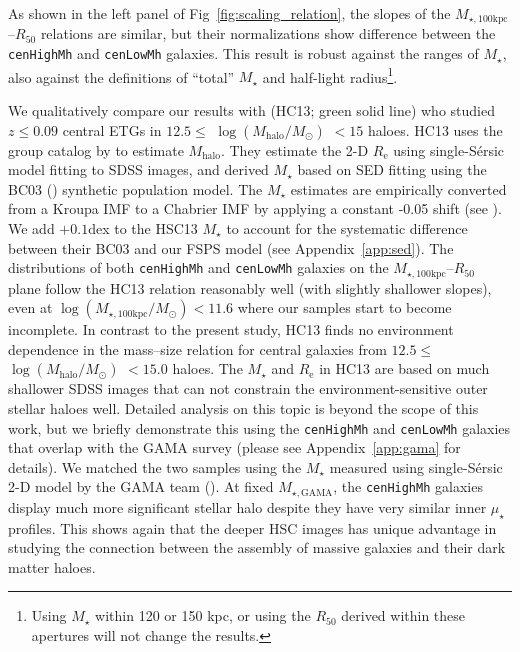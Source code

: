 \documentclass[a4paper,fleqn,usenatbib]{mnras}
\def\ser{{S\'{e}rsic\ }}
\def\rbcg{\texttt{cenHighMh}}
\def\nbcg{\texttt{cenLowMh}}
\def\mstar{{$M_{\star}$}}
\def\mhalo{{$M_{\mathrm{halo}}$}}
\def\logmh{{$\log (M_{\mathrm{halo}}/M_{\odot})$}}
\def\mtot{{$M_{\star,100\mathrm{kpc}}$}}
\def\mgama{{$M_{\star,\mathrm{GAMA}}$}}
\def\logmtot{{$\log (M_{\star,100\mathrm{kpc}}/M_{\odot})$}}
\def\mden{{$\mu_{\star}$}}
\begin{document}
    \noindent As shown in the left panel of Fig~\ref{fig:scaling_relation}, the slopes 
    of the \mtot{}--$R_{\mathrm{50}}$ relations are similar, but their normalizations 
    show difference between the \rbcg{} and \nbcg{} galaxies. 
    This result is robust against the ranges of \mstar{}, also against the definitions 
    of  ``total'' \mstar{} and half-light radius\footnote{Using \mstar{} within 120 or 
    150 kpc, or using the $R_{\mathrm{50}}$ derived within these apertures will not 
    change the results.}.
    
    We qualitatively compare our results with \citealt{HCompany13} (HC13; 
    green solid line) who studied $z\leq 0.09$ central ETGs in 
    $12.5 \le$ \logmh{} $< 15$ haloes. 
    HC13 uses the group catalog by \citet{Yang2007} to estimate \mhalo{}. 
    They estimate the 2-D $R_{\mathrm{e}}$ using single-\ser{} model fitting to SDSS 
    images, and derived \mstar{} based on SED fitting using the BC03 (\citealt{BC03}) 
    synthetic population model. 
    The \mstar{} estimates are empirically converted from a Kroupa IMF to a Chabrier 
    IMF by applying a constant -0.05 shift (see \citealt{Bernardi2016}).
    We add $+0.1$dex to the HSC13 \mstar{} to account for the systematic 
    difference between their BC03 and our FSPS model (see Appendix~\ref{app:sed}). 
    The distributions of both \rbcg{} and \nbcg{} galaxies on the 
    \mtot{}--$R_{\mathrm{50}}$ plane follow the HC13 relation reasonably well 
    (with slightly shallower slopes), even at \logmtot{}$< 11.6$ where our samples 
    start to become incomplete. 
    In contrast to the present study, HC13 finds no environment dependence in the 
    mass--size relation for central galaxies from $12.5\le$ \logmh{} $<15.0$ haloes.
    The \mstar{} and $R_{\mathrm{e}}$ in HC13 are based on much shallower SDSS images
    that can not constrain the environment-sensitive outer stellar haloes well. 
    Detailed analysis on this topic is beyond the scope of this work, but we briefly 
    demonstrate this using the \rbcg{} and \nbcg{} galaxies that overlap with the GAMA
    survey (please see Appendix~\ref{app:gama} for details). 
    We matched the two samples using the \mstar{} measured using single-\ser{} 2-D
    model by the GAMA team (\citealt{Kelvin2012}). 
    At fixed \mgama{}, the \rbcg{} galaxies display much more significant stellar 
    halo despite they have very similar inner \mden{} profiles.  
    This shows again that the deeper HSC images has unique advantage in studying the
    connection between the assembly of massive galaxies and their dark matter haloes. 
\end{document}

